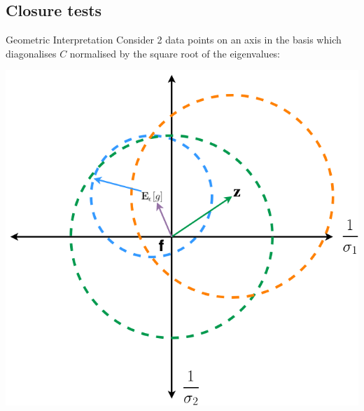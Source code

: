 \author[Michael Wilson]{}

\subsection{Closure tests}
\begin{frame}{Geometric Interpretation}
    \Fontvi
    Consider 2 data points on an axis in the basis which diagonalises $C$ normalised by the square root of the eigenvalues:

    \begin{center}
        \includegraphics[scale=0.3]{closure_test/testdiaggram.png}
    \end{center}
\end{frame}
